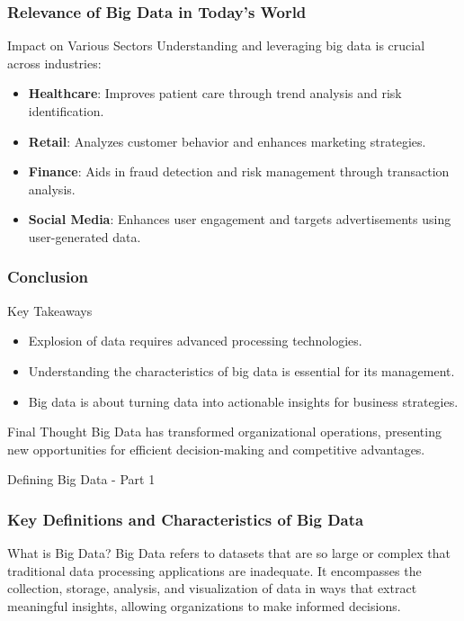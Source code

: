 \documentclass[aspectratio=169]{beamer}
\begin{document}
\begin{frame}[fragile]
    \frametitle{Relevance of Big Data in Today’s World}
    \begin{block}{Impact on Various Sectors}
        Understanding and leveraging big data is crucial across industries:
    \end{block}
    \begin{itemize}
        \item \textbf{Healthcare}: Improves patient care through trend analysis and risk identification.
        \item \textbf{Retail}: Analyzes customer behavior and enhances marketing strategies.
        \item \textbf{Finance}: Aids in fraud detection and risk management through transaction analysis.
        \item \textbf{Social Media}: Enhances user engagement and targets advertisements using user-generated data.
    \end{itemize}
\end{frame}

\begin{frame}[fragile]
    \frametitle{Conclusion}
    \begin{block}{Key Takeaways}
        \begin{itemize}
            \item Explosion of data requires advanced processing technologies.
            \item Understanding the characteristics of big data is essential for its management.
            \item Big data is about turning data into actionable insights for business strategies.
        \end{itemize}
    \end{block}
    \begin{block}{Final Thought}
        Big Data has transformed organizational operations, presenting new opportunities for efficient decision-making and competitive advantages.
    \end{block}
\end{frame}

\begin{frame}[fragile]{Defining Big Data - Part 1}
    \frametitle{Key Definitions and Characteristics of Big Data}
    
    \begin{block}{What is Big Data?}
        Big Data refers to datasets that are so large or complex that traditional data processing applications are inadequate. It encompasses the collection, storage, analysis, and visualization of data in ways that extract meaningful insights, allowing organizations to make informed decisions.
    \end{block}
\end{frame}
\end{document}
